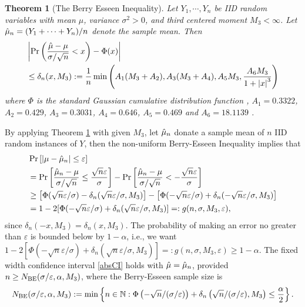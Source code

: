 \documentclass{iitthesis}
\newtheorem{theorem}{Theorem}[section]
\theoremstyle{definition}
\begin{document}
\begin{theorem}[The Berry Esseen Inequality] \label{BEThm}
Let $Y_1,\cdots,Y_n$ be IID random variables with mean $\mu$, variance $\sigma^2 >0$, and third centered moment $M_3 < \infty$. Let $\hat{\mu}_n = (Y_1+\cdots+Y_n)/n$ denote the sample mean. Then
\begin{align}
&\left \lvert \Pr\left(\frac{\hat{\mu}-\mu}{\sigma/\sqrt{n}}<x\right)-\Phi(x) \right \rvert \nonumber\\
& \leq \delta_n(x,M_3):=\frac{1}{n}\min\left( A_1(M_3+A_2),  A_3(M_3+A_4), A_5M_3, \frac{A_6M_3}{1+\left \lvert x \right \rvert^3}\right) \label{deltaBEconstant}
\end{align}
where $\Phi$ is the standard Gaussian cumulative distribution function , $A_1 = 0.3322$, $A_2 = 0.429$, $A_3=0.3031$, $A_4=0.646$, $A_5=0.469$ \cite{She13} and $A_6=18.1139$ \cite{NeShe12}.
\end{theorem}
By applying Theorem \ref{BEThm} with given $M_3$, let $\hat{\mu}_n$ donate a sample mean of $n$ IID random instances of $Y$, then the non-uniform Berry-Esseen Inequality implies that
\begin{align} 
&\Pr\left[\left \lvert \mu-\hat{\mu}_n \right \rvert  \le \varepsilon \right]\nonumber\\
&=\Pr\left[\frac{\hat{\mu}_n - \mu}{\sigma/\sqrt{n}} \le \frac{\sqrt{n}\varepsilon}{\sigma} \right]-\Pr\left[\frac{\hat{\mu}_n - \mu}{\sigma/\sqrt{n}} < -\frac{\sqrt{n}\varepsilon}{\sigma}\right] \nonumber \\ 
&\ge \left[\Phi(\sqrt{n}\varepsilon/\sigma)-\delta_n(\sqrt{n}\varepsilon/\sigma,M_3)\right] -\left[\Phi(-\sqrt{n}\varepsilon/\sigma) + \delta_n(-\sqrt{n}\varepsilon/\sigma,M_3)\right] \nonumber \\
&=1-2[\Phi(-\sqrt{n}\varepsilon/\sigma) + \delta_n(\sqrt{n}\varepsilon/\sigma,M_3)] =: g(n, \sigma, M_3, \varepsilon), \label{BEresult}
\end{align}
since $\delta_n(-x,M_3)=\delta_n(x,M_3)$. The probability of
making an error no greater than $\varepsilon$ is bounded below by $1-\alpha$, i.e., we want $1-2[\Phi(-\sqrt{n}\varepsilon/\sigma) + \delta_n(\sqrt{n}\varepsilon/\sigma,M_3)] =: g(n, \sigma, M_3, \varepsilon) \geq 1-\alpha$. The fixed width confidence interval \eqref{absCI} holds with $\hat{\mu}=\hat{\mu}_n$, provided $n \ge N_{\text{BE}}(\sigma/\varepsilon,\alpha,M_3)$, where the Berry-Esseen sample size is
\begin{equation}\label{NBE}
N_{\text{BE}}(\sigma/\varepsilon,\alpha,M_3) := \min  \left \{ n \in \mathbb{N} : \Phi\left(-\sqrt{n}/(\sigma /\varepsilon) \right)+\delta_n\left(\sqrt{n}/(\sigma /\varepsilon),M_3\right)
\le \frac{\alpha}{2} \right \}.
\end{equation}
\end{document}
